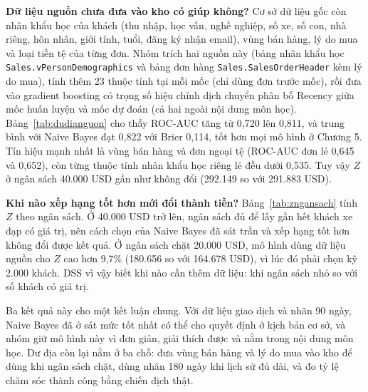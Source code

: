 \begin{table}[!htbp]
\centering
\caption{Giá trị ròng $Z$ của Naive Bayes so với các mức trần, trung bình bốn mốc}
\label{tab:dudiatran}
\footnotesize

\end{table}

\textbf{Dữ liệu nguồn chưa đưa vào kho có giúp không?} Cơ sở dữ liệu gốc còn nhân khẩu học của khách (thu nhập, học vấn, nghề nghiệp, số xe, số con, nhà riêng, hôn nhân, giới tính, tuổi, đăng ký nhận email), vùng bán hàng, lý do mua và loại tiền tệ của từng đơn. Nhóm trích hai nguồn này (bảng nhân khẩu học \texttt{Sales.vPersonDemographics} và bảng đơn hàng \texttt{Sales.SalesOrderHeader} kèm lý do mua), tính thêm 23 thuộc tính tại mỗi mốc (chỉ dùng đơn trước mốc), rồi đưa vào gradient boosting có trọng số hiệu chỉnh dịch chuyển phân bố Recency giữa mốc huấn luyện và mốc dự đoán (cả hai ngoài nội dung môn học). Bảng~\ref{tab:dudianguon} cho thấy ROC-AUC tăng từ 0,720 lên 0,811, và trung bình với Naive Bayes đạt 0,822 với Brier 0,114, tốt hơn mọi mô hình ở Chương 5. Tín hiệu mạnh nhất là vùng bán hàng và đơn ngoại tệ (ROC-AUC đơn lẻ 0,645 và 0,652), còn từng thuộc tính nhân khẩu học riêng lẻ đều dưới 0,535. Tuy vậy $Z$ ở ngân sách 40.000 USD gần như không đổi (292.149 so với 291.883 USD).

\begin{table}[!htbp]
\centering
\caption{Mô hình dùng thêm dữ liệu nguồn chưa có trong kho}
\label{tab:dudianguon}
\footnotesize
\resizebox{\textwidth}{!}{}
\end{table}

\textbf{Khi nào xếp hạng tốt hơn mới đổi thành tiền?} Bảng~\ref{tab:zngansach} tính $Z$ theo ngân sách. Ở 40.000 USD trở lên, ngân sách đủ để lấy gần hết khách xe đạp có giá trị, nên cách chọn của Naive Bayes đã sát trần và xếp hạng tốt hơn không đổi được kết quả. Ở ngân sách chặt 20.000 USD, mô hình dùng dữ liệu nguồn cho $Z$ cao hơn 9,7\% (180.656 so với 164.678 USD), vì lúc đó phải chọn kỹ 2.000 khách. DSS vì vậy biết khi nào cần thêm dữ liệu: khi ngân sách nhỏ so với số khách có giá trị.

\begin{table}[!htbp]
\centering
\caption{Giá trị ròng $Z$ (USD) theo ngân sách $B$, trung bình bốn mốc đánh giá}
\label{tab:zngansach}
\footnotesize
\resizebox{\textwidth}{!}{}
\end{table}

Ba kết quả này cho một kết luận chung. Với dữ liệu giao dịch và nhãn 90 ngày, Naive Bayes đã ở sát mức tốt nhất có thể cho quyết định ở kịch bản cơ sở, và nhóm giữ mô hình này vì đơn giản, giải thích được và nằm trong nội dung môn học. Dư địa còn lại nằm ở ba chỗ: đưa vùng bán hàng và lý do mua vào kho để dùng khi ngân sách chặt, dùng nhãn 180 ngày khi lịch sử đủ dài, và đo tỷ lệ chăm sóc thành công bằng chiến dịch thật.


